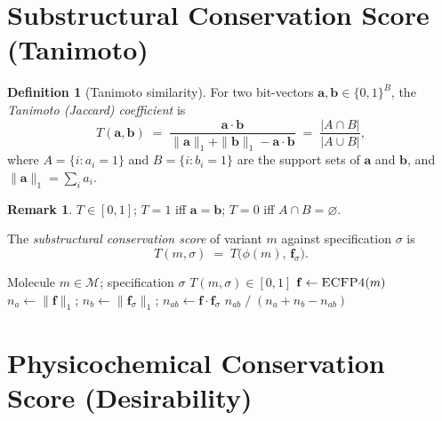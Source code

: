 \documentclass[11pt, a4paper]{article}
\theoremstyle{definition}
\newtheorem{definition}{Definition}[section]
\newtheorem{remark}{Remark}[section]
\newcommand{\1}[1]{\mathbf{1}\!\left[#1\right]}   %
\newcommand{\fp}[1]{\phi(#1)}                       %
\begin{document}
\section{Substructural Conservation Score (Tanimoto)}
\label{sec:tanimoto}

\begin{definition}[Tanimoto similarity]
\label{def:tanimoto}
For two bit-vectors $\mathbf{a}, \mathbf{b} \in \{0,1\}^B$,
the \emph{Tanimoto (Jaccard) coefficient} is
\[
  T(\mathbf{a}, \mathbf{b})
  \;=\; \frac{\mathbf{a} \cdot \mathbf{b}}
             {\|\mathbf{a}\|_1 + \|\mathbf{b}\|_1 - \mathbf{a} \cdot \mathbf{b}}
  \;=\; \frac{|A \cap B|}{|A \cup B|},
\]
where $A = \{i : a_i = 1\}$ and $B = \{i : b_i = 1\}$ are the
support sets of $\mathbf{a}$ and $\mathbf{b}$, and
$\|\mathbf{a}\|_1 = \sum_i a_i$.
\end{definition}

\begin{remark}
$T \in [0, 1]$; $T = 1$ iff $\mathbf{a} = \mathbf{b}$;
$T = 0$ iff $A \cap B = \varnothing$.
\end{remark}

The \emph{substructural conservation score} of variant $m$ against
specification $\sigma$ is
\[
  \boxed{T(m, \sigma) \;=\; T\!\bigl(\fp{m},\, \mathbf{f}_\sigma\bigr).}
\]

\begin{algorithm}[H]
\caption{\textsc{TanimotoToSpec}$(m, \sigma)$ --- substructural conservation score}
\label{alg:tanimoto}
\begin{algorithmic}[1]
\Require Molecule $m \in \mathcal{M}$; specification $\sigma$
\Ensure  $T(m, \sigma) \in [0, 1]$
\State $\mathbf{f} \leftarrow \textsc{ECFP4}(m)$
\State $n_a \leftarrow \|\mathbf{f}\|_1$;\quad
       $n_b \leftarrow \|\mathbf{f}_\sigma\|_1$;\quad
       $n_{ab} \leftarrow \mathbf{f} \cdot \mathbf{f}_\sigma$
\Return $n_{ab} \;/\; (n_a + n_b - n_{ab})$
\end{algorithmic}
\end{algorithm}


\section{Physicochemical Conservation Score (Desirability)}
\label{sec:desirability}
\end{document}
